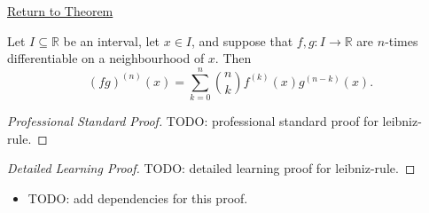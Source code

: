 \newpage
{}
\label{prf:leibniz-rule}

\begin{remark*}[Return]
\hyperref[thm:leibniz-rule]{Return to Theorem}
\end{remark*}

\begin{theorem*}
Let \(I\subseteq\mathbb{R}\) be an interval, let \(x\in I\), and suppose
that \(f,g:I\to\mathbb{R}\) are \(n\)-times differentiable on a
neighbourhood of \(x\). Then
\[
  (fg)^{(n)}(x)
  =
  \sum_{k=0}^{n}\binom{n}{k}f^{(k)}(x)g^{(n-k)}(x).
\]
\end{theorem*}

\begin{proof}[Professional Standard Proof]
\LRAProofBodyStart
TODO: professional standard proof for leibniz-rule.
\end{proof}

\begin{proof}[Detailed Learning Proof]
\LRAProofBodyStart
TODO: detailed learning proof for leibniz-rule.
\end{proof}

\begin{remark*}
\end{remark*}

\begin{dependencies}
\begin{itemize}
  \item TODO: add dependencies for this proof.
\end{itemize}
\end{dependencies}

\clearpage
